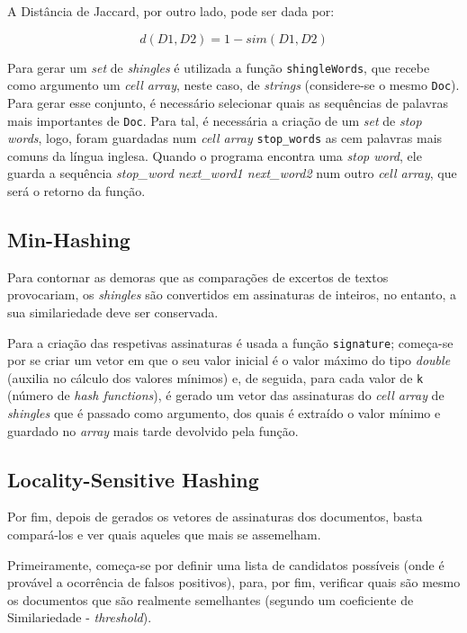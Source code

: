 \documentclass[a4paper,11pt,openright,oneside]{report}
\begin{document}
A Distância de Jaccard, por outro lado, pode ser dada por:

$$ d(D1, D2) = 1 - sim(D1, D2) $$

Para gerar um \textit{set} de \textit{shingles} é utilizada a função \texttt{shingleWords}, que recebe como argumento um \textit{cell array}, neste caso, de \textit{strings} (considere-se o mesmo \texttt{Doc}). Para gerar esse conjunto, é necessário selecionar quais as sequências de palavras mais importantes de \texttt{Doc}. Para tal, é necessária a criação de um \textit{set} de \textit{stop words}, logo, foram guardadas num \textit{cell array} \texttt{stop\_words} as cem palavras mais comuns da língua inglesa. Quando o programa encontra uma \textit{stop word}, ele guarda a sequência \textit{stop\_word next\_word1 next\_word2} num outro \textit{cell array}, que será o retorno da função.

\subsection{Min-Hashing}
\label{subsec.minhash}

Para contornar as demoras que as comparações de excertos de textos provocariam, os \textit{shingles} são convertidos em assinaturas de inteiros, no entanto, a sua similariedade deve ser conservada.

Para a criação das respetivas assinaturas é usada a função \texttt{signature}; começa-se por se criar um vetor em que o seu valor inicial é o valor máximo do tipo \textit{double} (auxilia no cálculo dos valores mínimos) e, de seguida, para cada valor de \texttt{k} (número de \textit{hash functions}), é gerado um vetor das assinaturas do \textit{cell array} de \textit{shingles} que é passado como argumento, dos quais é extraído o valor mínimo e guardado no \textit{array} mais tarde devolvido pela função.

\subsection{Locality-Sensitive Hashing}
\label{subsec.lsh}

Por fim, depois de gerados os vetores de assinaturas dos documentos, basta compará-los e ver quais aqueles que mais se assemelham.

Primeiramente, começa-se por definir uma lista de candidatos possíveis (onde é provável a ocorrência de falsos positivos), para, por fim, verificar quais são mesmo os documentos que são realmente semelhantes (segundo um coeficiente de Similariedade - \textit{threshold}).
\end{document}
